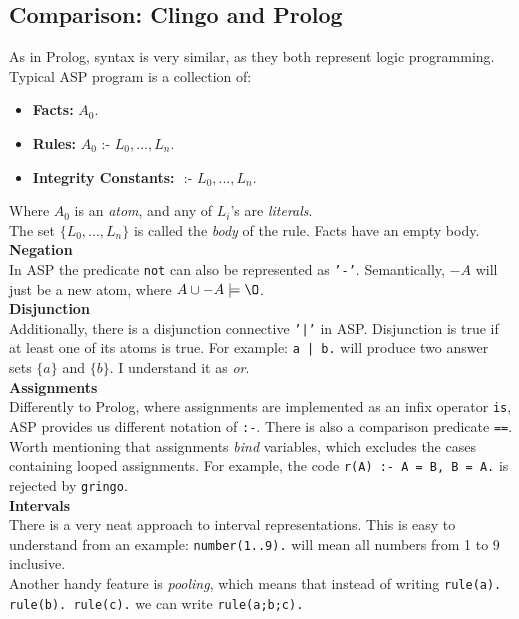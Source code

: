 \documentclass[11pt]{article}
\begin{document}
\subsection{Comparison: Clingo and Prolog}
As in Prolog, syntax is very similar, as they both represent logic programming.
Typical ASP program is a collection of:
\begin{itemize}
\item \textbf{Facts:} $A_0.$
\item \textbf{Rules:} $A_0 $ :- $ L_0,...,L_n.$
\item \textbf{Integrity Constants:} $ $ :- $ L_0,...,L_n.$
\end{itemize}
Where $A_0$ is an \emph{atom}, and any of $L_i$'s are \emph{literals}.\\
The set $\{L_0,...,L_n\}$ is called the \emph{body} of the rule. Facts have an empty body.\\

\textbf{Negation}\\
In ASP the predicate \texttt{not} can also be represented as \texttt{'-'}. Semantically, $-A$ will just be a new atom, where $A \cup -A \models {\O}$.\\

\textbf{Disjunction}\\
Additionally, there is a disjunction connective \texttt{'|'} in ASP. Disjunction is true if at least one of its atoms is true. For example: \texttt{a | b.} will produce two answer sets $\{a\}$ and $\{b\}$. I understand it as \emph{or}.\\

\textbf{Assignments}\\
Differently to Prolog, where assignments are implemented as an infix operator \texttt{is}, ASP provides us different notation of \texttt{:-}. There is also a comparison predicate \texttt{==}.\\ Worth mentioning that assignments \emph{bind} variables, which excludes the cases containing looped assignments. For example, the code \texttt{r(A) :- A = B, B = A.} is rejected by \texttt{gringo}.\\

\textbf{Intervals}\\
There is a very neat approach to interval representations. This is easy to understand from an example: \texttt{number(1..9).} will mean all numbers from 1 to 9 inclusive.\\Another handy feature is \emph{pooling}, which means that instead of writing \texttt{rule(a). rule(b). rule(c).} we can write \texttt{rule(a;b;c).}\\
\end{document}
